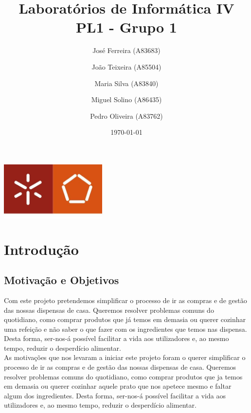 \documentclass[a4paper]{report}
\begin{document}
\title{Laboratórios de Informática IV\\
\large PL1 - Grupo 1}
\author{José Ferreira (A83683) \and João Teixeira (A85504) \and Maria Silva (A83840) \and Miguel Solino (A86435) \and Pedro Oliveira (A83762)}
\date{\today}

\begin{center}
    \begin{minipage}{0.75\linewidth}
        \centering
        \includegraphics[width=0.4\textwidth]{images/eng.jpeg}\par\vspace{1cm}
        \vspace{1.5cm}
        \href{https://www.uminho.pt/PT}
        {\color{black}{\scshape\LARGE Universidade do Minho}} \par
        \vspace{1cm}
        \href{https://www.di.uminho.pt/}
        {\color{black}{\scshape\Large Departamento de Informática}} \par
        \vspace{1.5cm}
        \maketitle
    \end{minipage}
\end{center}


\tableofcontents

\chapter{Introdução}
    \section{Motivação e Objetivos}
    Com este projeto pretendemos simplificar o processo de ir as compras e de
    gestão das nossas dispensas de casa. Queremos resolver problemas comuns do
    quotidiano, como comprar produtos que já temos em demasia ou querer cozinhar
    uma refeição e não saber o que fazer com os ingredientes que temos nas
    dispensa. Desta forma, ser-nos-á possível facilitar a vida aos utilizadores
    e, ao mesmo tempo, reduzir o desperdício alimentar.\\
    As motivações que nos levaram a iniciar este projeto foram o querer simplificar
    o processo de ir as compras e de gestão das nossas dispensas de casa.
    Queremos resolver problemas comuns do quotidiano, como comprar produtos que 
    ja temos em demasia ou querer cozinhar aquele prato que nos apetece mesmo e
    faltar algum dos ingredientes. Desta forma, ser-nos-á possível facilitar a
    vida aos utilizadores e, ao mesmo tempo, reduzir o desperdício alimentar.
\end{document}
